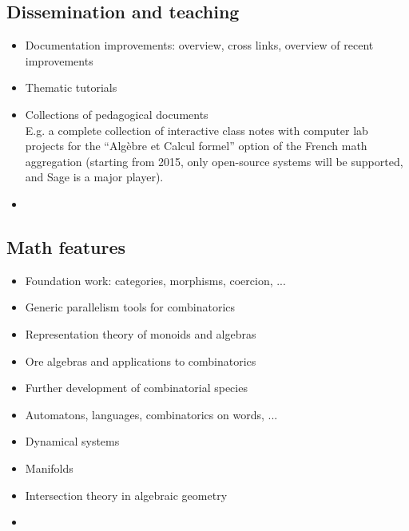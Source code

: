 \subsection{Dissemination and teaching}

\begin{itemize}
\item Documentation improvements: overview, cross links, overview of
  recent improvements
\item Thematic tutorials
\item Collections of pedagogical documents\\
  E.g. a complete collection of interactive class notes with computer
  lab projects for the ``Algèbre et Calcul formel'' option of the
  French math aggregation (starting from 2015, only open-source
  systems will be supported, and Sage is a major player).
\item {}
\end{itemize}

\subsection{Math features}

\begin{itemize}
\item Foundation work: categories, morphisms, coercion, ...
\item Generic parallelism tools for combinatorics
\item Representation theory of monoids and algebras
\item Ore algebras and applications to combinatorics
\item Further development of combinatorial species
\item Automatons, languages, combinatorics on words, ...
\item Dynamical systems
\item Manifolds
\item Intersection theory in algebraic geometry
\item {}
\end{itemize}

